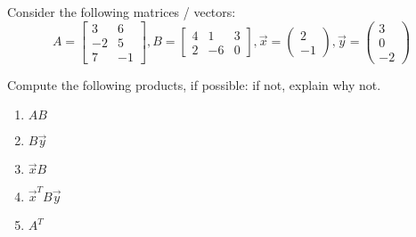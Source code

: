 \documentclass[12pt]{amsart}
\begin{document}
\begin{problem}
Consider the following matrices / vectors:
$$
A=\left[\begin{array}{cc}
3 & 6 \\
-2 & 5 \\
7 & -1
\end{array}\right], B=\left[\begin{array}{ccc}
4 & 1 & 3 \\
2 & -6 & 0
\end{array}\right], \vec{x}=\left(\begin{array}{c}
2 \\
-1
\end{array}\right), \vec{y}=\left(\begin{array}{c}
3 \\
0 \\
-2
\end{array}\right)
$$

Compute the following products, if possible: if not, explain why not.
\begin{enumerate}
    \item  $A B$
    \item $B \vec{y}$
    \item  $\vec{x} B$
    \item  $\vec{x}^T B \vec{y}$
    \item  $A^T$
\end{enumerate}
\end{problem}
\end{document}
